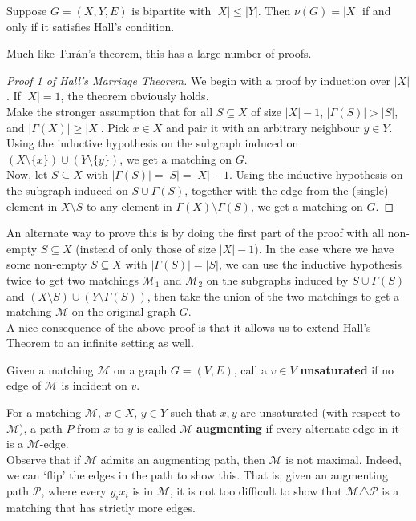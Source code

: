 			\begin{ftheo}
				Suppose $G=(X,Y,E)$ is bipartite with $|X|\le |Y|$. Then $\nu(G) = |X|$ if and only if it satisfies Hall's condition.
			\end{ftheo}
			Much like Tur\'{a}n's theorem, this has a large number of proofs.
			\begin{proof}[Proof 1 of Hall's Marriage Theorem]
				We begin with a proof by induction over $|X|$. If $|X|=1$, the theorem obviously holds.\\
				Make the stronger assumption that for all $S\subseteq X$ of size $|X|-1$, $|\Gamma(S)| > |S|$, and $|\Gamma(X)| \ge |X|$. Pick $x\in X$ and pair it with an arbitrary neighbour $y\in Y$. Using the inductive hypothesis on the subgraph induced on $(X\setminus\{x\}) \cup (Y\setminus\{y\})$, we get a matching on $G$.\\
				Now, let $S\subseteq X$ with $|\Gamma(S)|=|S|=|X|-1$. Using the inductive hypothesis on the subgraph induced on $S\cup\Gamma(S)$, together with the edge from the (single) element in $X\setminus S$ to any element in $\Gamma(X)\setminus\Gamma(S)$, we get a matching on $G$.
			\end{proof}
			An alternate way to prove this is by doing the first part of the proof with all non-empty $S\subseteq X$ (instead of only those of size $|X|-1$). In the case where we have some non-empty $S\subseteq X$ with $|\Gamma(S)|=|S|$, we can use the inductive hypothesis twice to get two matchings $\mathcal{M}_1$ and $\mathcal{M}_2$ on the subgraphs induced by $S \cup \Gamma(S)$ and $(X\setminus S) \cup (Y\setminus\Gamma(S))$, then take the union of the two matchings to get a matching $\mathcal{M}$ on the original graph $G$.\\

			A nice consequence of the above proof is that it allows us to extend Hall's Theorem to an infinite setting as well.

			\begin{definition}
				Given a matching $\mathcal{M}$ on a graph $G=(V,E)$, call a $v\in V$ \textbf{unsaturated} if no edge of $\mathcal{M}$ is incident on $v$.
			\end{definition}

			For a matching $\mathcal{M}$, $x\in X$, $y\in Y$ such that $x,y$ are unsaturated (with respect to $\mathcal{M}$), a path $P$ from $x$ to $y$ is called $\mathcal{M}$-\textbf{augmenting} if every alternate edge in it is a $\mathcal{M}$-edge.\\
			Observe that if $\mathcal{M}$ admits an augmenting path, then $\mathcal{M}$ is not maximal. Indeed, we can `flip' the edges in the path to show this. That is, given an augmenting path $\mathcal{P}$, where every $y_ix_i$ is in $\mathcal{M}$, it is not too difficult to show that $\mathcal{M} \triangle \mathcal{P}$ is a matching that has strictly more edges.\\

